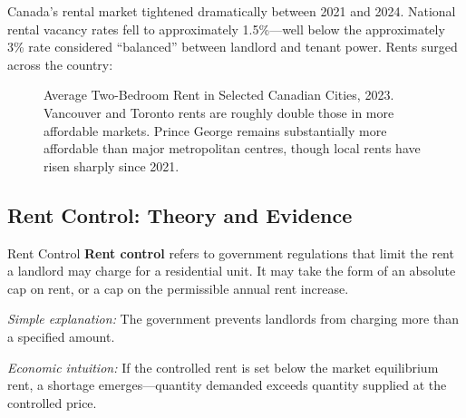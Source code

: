 Canada's rental market tightened dramatically between 2021 and 2024. National rental vacancy rates fell to approximately 1.5\%---well below the approximately 3\% rate considered ``balanced'' between landlord and tenant power. Rents surged across the country:

\begin{figure}[H]
\centering
{}
\caption{Average Two-Bedroom Rent in Selected Canadian Cities, 2023. Vancouver and Toronto
  rents are roughly double those in more affordable markets. Prince George remains
  substantially more affordable than major metropolitan centres, though local rents
  have risen sharply since 2021.}
\label{fig:rents}
\end{figure}

\subsection{Rent Control: Theory and Evidence}

\begin{defbox}{Rent Control}
\textbf{Rent control} refers to government regulations that limit the rent a landlord may charge for a residential unit. It may take the form of an absolute cap on rent, or a cap on the permissible annual rent increase.

\textit{Simple explanation:} The government prevents landlords from charging more than a specified amount.

\textit{Economic intuition:} If the controlled rent is set below the market equilibrium rent, a shortage emerges---quantity demanded exceeds quantity supplied at the controlled price.
\end{defbox}

